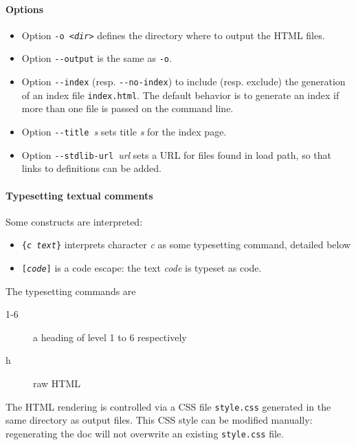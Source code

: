 \paragraph{Options}

\begin{itemize}
\item Option \texttt{-o \textsl{<dir>}} defines the directory where to
  output the HTML files.
\item Option \verb|--output| is the same as \verb|-o|.
\item Option \verb|--index| (resp. \verb|--no-index|) to include
  (resp. exclude) the generation of an index file \texttt{index.html}.
  The default behavior is to generate an index if more than one file
  is passed on the command line.
\item Option \verb|--title|~\textsl{s} sets title \textsl{s} for the
  index page.
\item Option \verb|--stdlib-url|~\textsl{url} sets a URL for files
  found in load path, so that links to definitions can be added.
\end{itemize}

\paragraph{Typesetting textual comments}

Some constructs are interpreted:
\begin{itemize}
\item \texttt{\{\textsl{c text}\}} interprets character \textsl{c} as
  some typesetting command, detailed below
\item \texttt{[\textsl{code}]} is a code escape: the text
  \textsl{code} is typeset as \why code.
\end{itemize}

The typesetting commands are
\begin{description}
\item[1-6] a heading of level 1 to 6 respectively
\item[h] raw HTML
\end{description}

The HTML rendering is controlled via a CSS file \verb|style.css|
generated in the same directory as output files. This CSS style can be
modified manually: regenerating the doc will not overwrite an existing
\verb|style.css| file.



